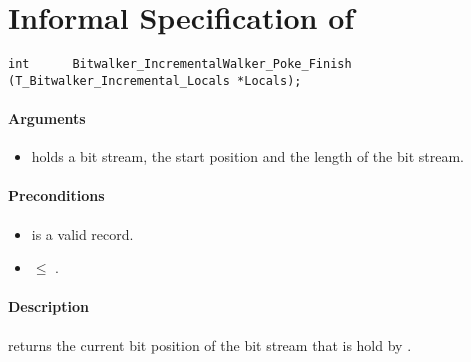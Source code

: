 \clearpage

\section{Informal Specification of }

\begin{lstlisting}[style=acsl-block]
int		 Bitwalker_IncrementalWalker_Poke_Finish (T_Bitwalker_Incremental_Locals *Locals);
\end{lstlisting}

\paragraph{Arguments}
\begin{itemize}
    \item  {} holds a bit stream, the start position and the length of the bit stream.
\end{itemize}

\paragraph{Preconditions}
\begin{itemize}
    \item  {} is a valid record.
    \item {} $\leq $ .
\end{itemize}

\paragraph{Description}

\peekfinish  returns the current bit position of the bit stream that is hold by .


